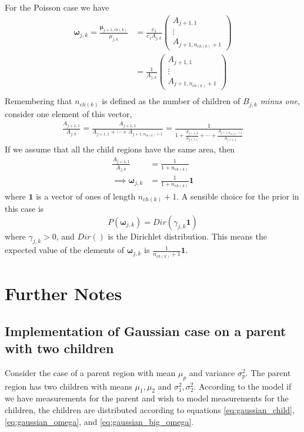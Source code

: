 \documentclass[a4paper,12pt]{article}
\theoremstyle{definition}
\begin{document}
For the Poisson case we have
\begin{align*}
	\boldsymbol{\omega}_{j,k} = \frac{\boldsymbol{\mu}_{j+1,ch(k)}}{\mu_{j,k}} &= \frac{c_1}{c_1 A_{j,k}}\begin{pmatrix}
																																																				A_{j+1,1} \\
																																																				\vdots \\
																																																				A_{j+1,n_{ch(k)}+1}
																																																			\end{pmatrix} \\
		&= \frac{1}{A_{j,k}}\begin{pmatrix}
													A_{j+1,1} \\
													\vdots \\
													A_{j+1,n_{ch(k)}+1}
												\end{pmatrix} \\
\end{align*}
Remembering that $n_{ch(k)}$ is defined as the number of children of $B_{j,k}$ \textit{minus one}, consider one element of this vector,
\begin{align*}
	\frac{A_{j+1,1}}{A_{j,k}} = \frac{A_{j+1,1}}{A_{j+1,1} + \cdots + A_{j+1,n_{ch(k)}+1}} = \frac{1}{1 + \frac{A_{j+1,2}}{A_{j+1,1}} + \cdots + \frac{A_{j+1,n_{ch(k)}+1}}{A_{j+1,1}}}
\end{align*}
If we assume that all the child regions have the same area, then
\begin{align*}
	\frac{A_{j+1,1}}{A_{j,k}} &= \frac{1}{1 + n_{ch(k)}} \\
	\implies \boldsymbol{\omega}_{j,k} &= \frac{1}{1 + n_{ch(k)}} \mathbf{1}
\end{align*}
where $\mathbf{1}$ is a vector of ones of length $n_{ch(k)}+1$. A sensible choice for the prior in this case is
\begin{equation}
	P(\boldsymbol{\omega}_{j,k}) = Dir(\gamma_{j,k} \mathbf{1})
\end{equation}
where $\gamma_{j,k} > 0$, and $Dir()$ is the Dirichlet distribution. This means the expected value of the elements of $\boldsymbol{\omega}_{j,k}$ is $\frac{1}{n_{ch(k)}+1} \mathbf{1}$.


\section{Further Notes}
\subsection{Implementation of Gaussian case on a parent with two children}\label{sec:implementation}
Consider the case of a parent region with mean $\mu_p$ and variance $\sigma_p^2$. The parent region has two children with means $\mu_1, \mu_2$ and $\sigma_1^2, \sigma_2^2$. According to the model if we have measurements for the parent and wish to model measurements for the children, the children are distributed according to equations \ref{eq:gaussian_child}, \ref{eq:gaussian_omega}, and \ref{eq:gaussian_big_omega}.
\end{document}
